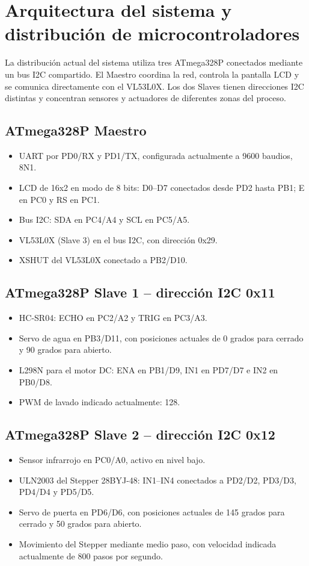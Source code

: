 \section{Arquitectura del sistema y distribución de microcontroladores}

La distribución actual del sistema utiliza tres ATmega328P conectados mediante un bus I2C compartido. El Maestro coordina la red, controla la pantalla LCD y se comunica directamente con el VL53L0X. Los dos Slaves tienen direcciones I2C distintas y concentran sensores y actuadores de diferentes zonas del proceso.

\subsection{ATmega328P Maestro}
\begin{itemize}[leftmargin=*]
    \item UART por PD0/RX y PD1/TX, configurada actualmente a 9600 baudios, 8N1.
    \item LCD de 16x2 en modo de 8 bits: D0--D7 conectados desde PD2 hasta PB1; E en PC0 y RS en PC1.
    \item Bus I2C: SDA en PC4/A4 y SCL en PC5/A5.
    \item VL53L0X (Slave 3) en el bus I2C, con dirección 0x29.
    \item XSHUT del VL53L0X conectado a PB2/D10.
\end{itemize}

\subsection{ATmega328P Slave 1 -- dirección I2C 0x11}
\begin{itemize}[leftmargin=*]
    \item HC-SR04: ECHO en PC2/A2 y TRIG en PC3/A3.
    \item Servo de agua en PB3/D11, con posiciones actuales de 0 grados para cerrado y 90 grados para abierto.
    \item L298N para el motor DC: ENA en PB1/D9, IN1 en PD7/D7 e IN2 en PB0/D8.
    \item PWM de lavado indicado actualmente: 128.
\end{itemize}

\subsection{ATmega328P Slave 2 -- dirección I2C 0x12}
\begin{itemize}[leftmargin=*]
    \item Sensor infrarrojo en PC0/A0, activo en nivel bajo.
    \item ULN2003 del Stepper 28BYJ-48: IN1--IN4 conectados a PD2/D2, PD3/D3, PD4/D4 y PD5/D5.
    \item Servo de puerta en PD6/D6, con posiciones actuales de 145 grados para cerrado y 50 grados para abierto.
    \item Movimiento del Stepper mediante medio paso, con velocidad indicada actualmente de 800 pasos por segundo.
\end{itemize}

